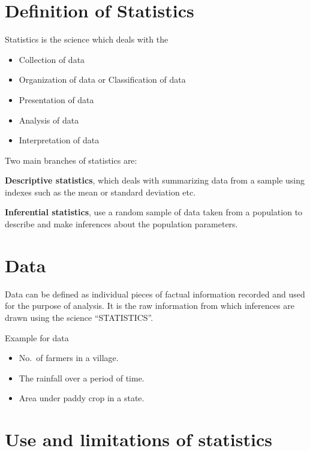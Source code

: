 \documentclass[
]{book}
\begin{document}
\hypertarget{definition-of-statistics}{%
\section{Definition of Statistics}\label{definition-of-statistics}}

Statistics is the science which deals with the

\begin{itemize}
\item
  Collection of data
\item
  Organization of data or Classification of data
\item
  Presentation of data
\item
  Analysis of data
\item
  Interpretation of data
\end{itemize}

Two main branches of statistics are:

\textbf{Descriptive statistics}, which deals with summarizing data from a
sample using indexes such as the mean or standard deviation etc.

\textbf{Inferential statistics}, use a random sample of data taken from a
population to describe and make inferences about the population
parameters.

\hypertarget{data}{%
\section{Data}\label{data}}

Data can be defined as individual pieces of factual information recorded
and used for the purpose of analysis. It is the raw information from
which inferences are drawn using the science ``STATISTICS''.

Example for data

\begin{itemize}
\item
  No.~of farmers in a village.
\item
  The rainfall over a period of time.
\item
  Area under paddy crop in a state.
\end{itemize}

\hypertarget{use-and-limitations-of-statistics}{%
\section{Use and limitations of statistics}\label{use-and-limitations-of-statistics}}
\end{document}
